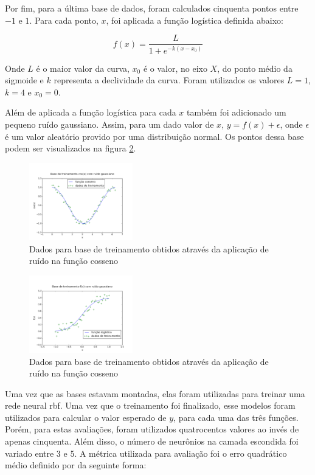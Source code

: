 \documentclass[conference]{IEEEtran}
\begin{document}
Por fim, para a última base de dados, foram calculados cinquenta pontos entre 
$-1$ e $1$. Para cada ponto, $x$, foi aplicada a função logística \cite{logist} 
definida abaixo:

$$f(x) = \frac{L}{1 + e^{-k(x-x_{0})}}$$

Onde $L$ é o maior valor da curva, $x_{0}$ é o valor, no eixo $X$, do ponto 
médio da sigmoide e $k$ representa a declividade da curva. Foram utilizados os 
valores $L = 1$, $k = 4$ e $x_{0} = 0$.

Além de aplicada a função logística para cada $x$ também foi adicionado um 
pequeno ruído gaussiano. Assim, para um dado valor de $x$, $y = f(x) + 
\epsilon$, onde $\epsilon$ é um valor aleatório provido por uma distribuição 
normal. Os pontos dessa base podem ser visualizados na figura 
\ref{fig:logistica}.

\begin{figure}[t]
	\caption{Dados para base de treinamento obtidos através da aplicação de 
		ruído na função cosseno}
	\label{fig:cosseno_dados}
	\centering
	\includegraphics[width=0.40\textwidth]{cos_5v1_train_data_paper}
\end{figure}

\begin{figure}[b]
	\caption{Dados para base de treinamento obtidos através da aplicação de 
		ruído na função cosseno}
	\label{fig:logistica}
	\centering
	\includegraphics[width=0.40\textwidth]{f_5v1_train_data_paper}
\end{figure}


Uma vez que as bases estavam montadas, elas foram utilizadas para treinar uma 
rede neural \ac*{rbf}. Uma vez que o treinamento foi finalizado, esse modelos 
foram utilizados para calcular o valor esperado de $y$, para cada uma das três 
funções. Porém, para estas avaliações, foram utilizados quatrocentos valores ao 
invés de apenas cinquenta. Além disso, o número de neurônios na camada escondida 
foi variado entre 3 e 5. A métrica utilizada para avaliação foi o erro 
quadrático médio definido por \cite{daredes} da seguinte forma: 
\end{document}
